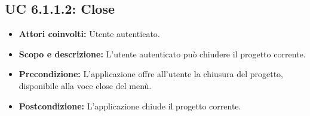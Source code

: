 \subsection{UC 6.1.1.2: Close}
\begin{itemize}
		\item \textbf{Attori coinvolti:} Utente autenticato. \\
		\item \textbf{Scopo e descrizione:} L'utente autenticato può chiudere il progetto corrente. \\
		\item \textbf{Precondizione:} L'applicazione offre all'utente la chiusura del progetto, disponibile alla voce close del menù. \\
		\item \textbf{Postcondizione:} L'applicazione chiude il progetto corrente. \\
\end{itemize}